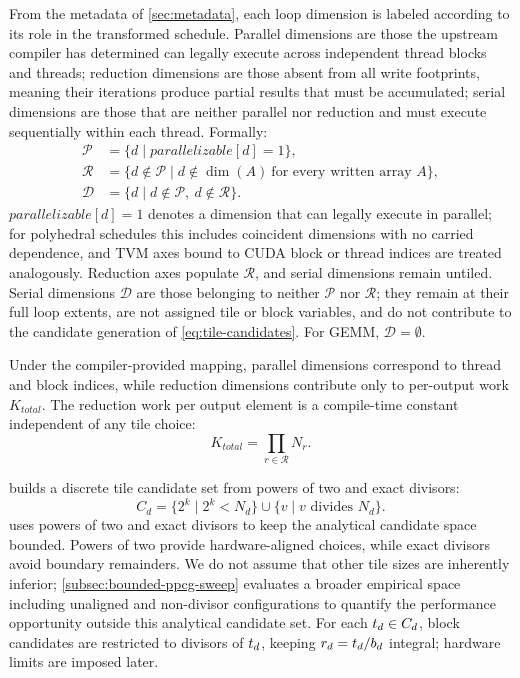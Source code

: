 From the metadata of \autoref{sec:metadata}, each loop dimension is labeled according to its role in the transformed schedule. Parallel dimensions are those the upstream compiler has determined can legally execute across independent thread blocks and threads; reduction dimensions are those absent from all write footprints, meaning their iterations produce partial results that must be accumulated; serial dimensions are those that are neither parallel nor reduction and must execute sequentially within each thread. Formally:
\begin{equation}
\begin{aligned}
\mathcal{P}
&= \{d \mid \mathit{parallelizable}[d] = 1\},\\
\mathcal{R}
&= \{d \notin \mathcal{P}
    \mid d \notin \dim(A)\ \text{for every written array } A\},\\
\mathcal{D}
&= \{d \mid d\notin\mathcal{P},\ d\notin\mathcal{R}\}.
\end{aligned}
\label{eq:dimension-roles}
\end{equation}
\(\mathit{parallelizable}[d]=1\) denotes a dimension that can legally execute in parallel; for polyhedral schedules this includes coincident dimensions with no carried dependence, and TVM axes bound to CUDA block or thread indices are treated analogously. Reduction axes populate \(\mathcal{R}\), and serial dimensions remain untiled. Serial dimensions \(\mathcal{D}\) are those belonging to neither \(\mathcal{P}\) nor \(\mathcal{R}\); they remain at their full loop extents, are not assigned tile or block variables, and do not contribute to the candidate generation of \autoref{eq:tile-candidates}. For GEMM, \(\mathcal{D}=\emptyset\).

Under the compiler-provided mapping, parallel dimensions correspond to thread and block indices, while reduction dimensions contribute only to per-output work \(K_{\mathit{total}}\). The reduction work per output element is a compile-time constant independent of any tile choice:
\begin{equation}
K_{\mathit{total}} = \prod_{r \in \mathcal{R}} N_r.
\label{eq:reduction-work}
\end{equation}

\name builds a discrete tile candidate set from powers of two and exact divisors:
\begin{equation}
C_d
= \{2^k \mid 2^k < N_d\}
  \cup \{v \mid v \text{ divides } N_d\}.
\label{eq:tile-candidates}
\end{equation}
\name uses powers of two and exact divisors to keep the analytical candidate space bounded. Powers of two provide hardware-aligned choices, while exact divisors avoid boundary remainders. We do not assume that other tile sizes are inherently inferior; \autoref{subsec:bounded-ppcg-sweep} evaluates a broader empirical space including unaligned and non-divisor configurations to quantify the performance opportunity outside this analytical candidate set. For each \(t_d\in C_d\), block candidates are restricted to divisors of \(t_d\), keeping
\(r_d=t_d/b_d\) integral; hardware limits are imposed later.

